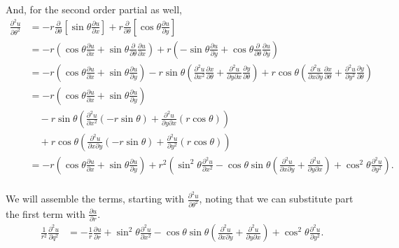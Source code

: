 \documentclass{article}
\begin{document}
  And, for the second order partial as well,
  \begin{align*}
    \frac{\partial^{2} u}{\partial \theta^2}&= -r \frac{\partial}{\partial \theta}\left[ \sin \theta \frac{\partial u}{\partial x} \right] + r \frac{\partial}{\partial \theta}\left[ \cos \theta \frac{\partial u}{\partial y} \right] \\
    &= -r\left( \cos \theta \frac{\partial u}{\partial x} + \sin \theta \frac{\partial}{\partial \theta}\frac{\partial u}{\partial x} \right) + r\left( -\sin \theta \frac{\partial u}{\partial y} + \cos \theta \frac{\partial}{\partial \theta}\frac{\partial u}{\partial y} \right) \\
    &= -r\left(\cos \theta \frac{\partial u}{\partial x} + \sin \theta \frac{\partial u}{\partial y}\right)-r\sin \theta\left( \frac{\partial^{2} u}{\partial x^2}\frac{\partial x}{\partial \theta}+\frac{\partial^2 u}{\partial y \partial x}\frac{\partial y}{\partial \theta} \right)+r\cos \theta\left( \frac{\partial^2 u}{\partial x \partial y}\frac{\partial x}{\partial \theta}+\frac{\partial^{2} u}{\partial y^2}\frac{\partial y}{\partial \theta} \right) \\
    &= -r\left(\cos \theta \frac{\partial u}{\partial x} + \sin \theta \frac{\partial u}{\partial y}\right)\\&\quad-r\sin\theta\left( \frac{\partial^{2} u}{\partial x^2}(-r\sin \theta)+\frac{\partial^2 u}{\partial y \partial x}(r\cos \theta) \right)\\&\quad+r\cos\theta\left( \frac{\partial^2 u}{\partial x \partial y}(-r\sin \theta)+\frac{\partial^{2} u}{\partial y^2}(r\cos \theta) \right) \\
    &= -r \left(\cos \theta \frac{\partial u}{\partial x} + \sin \theta \frac{\partial u}{\partial y}\right) + r^2\left( \sin^2 \theta \frac{\partial^{2} u}{\partial x^2} -\cos \theta \sin \theta \left( \frac{\partial^2 u}{\partial x \partial y} + \frac{\partial^2 u}{\partial y \partial x} \right) +\cos^2 \theta \frac{\partial^{2} u}{\partial y^2} \right). \\
  \end{align*}

  We will assemble the terms, starting with $\frac{\partial^{2} u}{\partial \theta^2}$, noting that we can substitute part the first term with $\frac{\partial u}{\partial r}$.
  \begin{align*}
    \frac{1}{r^2} \frac{\partial^{2} u}{\partial q^2} &= -\frac{1}{r}\frac{\partial u}{\partial r}+\sin^2 \theta \frac{\partial^{2} u}{\partial x^2} -\cos \theta \sin \theta \left( \frac{\partial^2 u}{\partial x \partial y} + \frac{\partial^2 u}{\partial y \partial x} \right)+\cos^2 \theta \frac{\partial^{2} u}{\partial y^2}. \\
  \end{align*}
\end{document}
